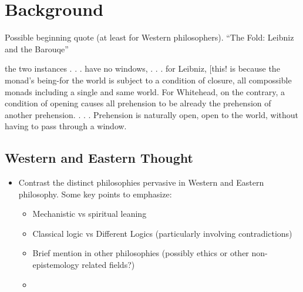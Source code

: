 \chapter{Background}
\label{ch:background}

Possible beginning quote (at least for Western philosophers). ``The Fold: Leibniz and the Barouqe''
\begin{displayquote}
the two instances . . . have no windows, . . . for Leibniz, [this! is because the monad’s being-for the world is subject to a condition of closure, all compossible monads including a single and same world. For Whitehead, on the contrary, a condition of opening causes all prehension to be already the prehension of another prehension. . . . Prehension is naturally open, open to the world, without having to pass through a window.
\end{displayquote}

\section{Western and Eastern Thought}

\begin{itemize}
  \item Contrast the distinct philosophies pervasive in Western and Eastern philosophy. Some key points to emphasize:
        \begin{itemize}
          \item Mechanistic vs spiritual leaning
          \item Classical logic vs Different Logics (particularly involving contradictions)
          \item Brief mention in other philosophies (possibly ethics or other non-epistemology related fields?)
          \item
        \end{itemize}
\end{itemize}

